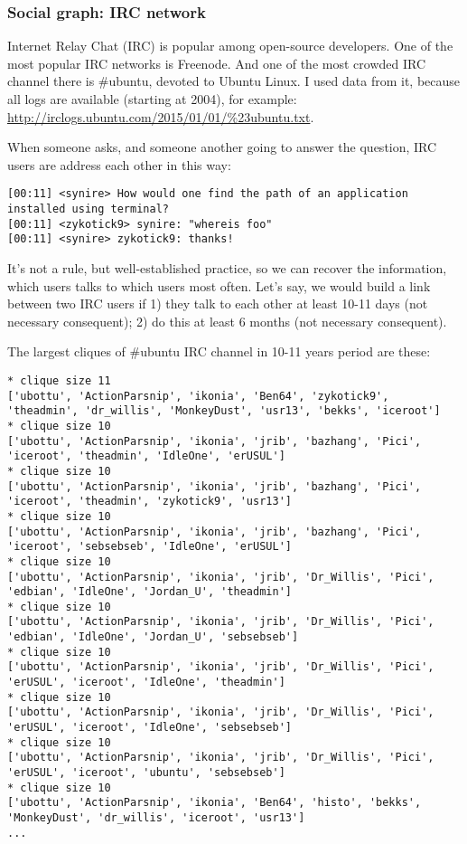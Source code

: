 \begin{figure}[H]
\centering
{}
\end{figure}

\subsubsection{Social graph: IRC network}

Internet Relay Chat (IRC) is popular among open-source developers.
One of the most popular IRC networks is Freenode.
And one of the most crowded IRC channel there is \#ubuntu, devoted to Ubuntu Linux.
I used data from it, because all logs are available (starting at 2004), for example:
\url{http://irclogs.ubuntu.com/2015/01/01/%23ubuntu.txt}.

When someone asks, and someone another going to answer the question, IRC users are address each other in this way:

\begin{lstlisting}
[00:11] <synire> How would one find the path of an application installed using terminal?
[00:11] <zykotick9> synire: "whereis foo"
[00:11] <synire> zykotick9: thanks!
\end{lstlisting}

It's not a rule, but well-established practice, so we can recover the information, which users talks to which users most often.
Let's say, we would build a link between two IRC users if 
1) they talk to each other at least 10-11 days (not necessary consequent);
2) do this at least 6 months (not necessary consequent).

The largest cliques of \#ubuntu IRC channel in 10-11 years period are these:

\begin{lstlisting}
* clique size 11
['ubottu', 'ActionParsnip', 'ikonia', 'Ben64', 'zykotick9', 'theadmin', 'dr_willis', 'MonkeyDust', 'usr13', 'bekks', 'iceroot']
* clique size 10
['ubottu', 'ActionParsnip', 'ikonia', 'jrib', 'bazhang', 'Pici', 'iceroot', 'theadmin', 'IdleOne', 'erUSUL']
* clique size 10
['ubottu', 'ActionParsnip', 'ikonia', 'jrib', 'bazhang', 'Pici', 'iceroot', 'theadmin', 'zykotick9', 'usr13']
* clique size 10
['ubottu', 'ActionParsnip', 'ikonia', 'jrib', 'bazhang', 'Pici', 'iceroot', 'sebsebseb', 'IdleOne', 'erUSUL']
* clique size 10
['ubottu', 'ActionParsnip', 'ikonia', 'jrib', 'Dr_Willis', 'Pici', 'edbian', 'IdleOne', 'Jordan_U', 'theadmin']
* clique size 10
['ubottu', 'ActionParsnip', 'ikonia', 'jrib', 'Dr_Willis', 'Pici', 'edbian', 'IdleOne', 'Jordan_U', 'sebsebseb']
* clique size 10
['ubottu', 'ActionParsnip', 'ikonia', 'jrib', 'Dr_Willis', 'Pici', 'erUSUL', 'iceroot', 'IdleOne', 'theadmin']
* clique size 10
['ubottu', 'ActionParsnip', 'ikonia', 'jrib', 'Dr_Willis', 'Pici', 'erUSUL', 'iceroot', 'IdleOne', 'sebsebseb']
* clique size 10
['ubottu', 'ActionParsnip', 'ikonia', 'jrib', 'Dr_Willis', 'Pici', 'erUSUL', 'iceroot', 'ubuntu', 'sebsebseb']
* clique size 10
['ubottu', 'ActionParsnip', 'ikonia', 'Ben64', 'histo', 'bekks', 'MonkeyDust', 'dr_willis', 'iceroot', 'usr13']
...
\end{lstlisting}

